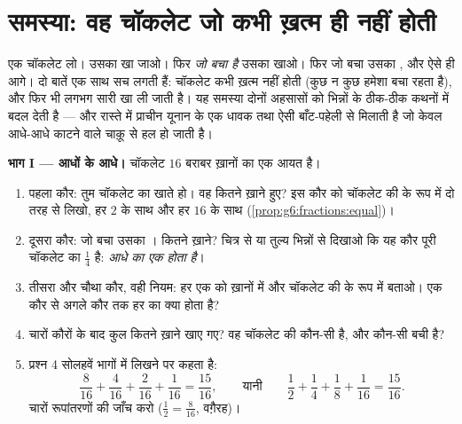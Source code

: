 \section{समस्या: वह चॉकलेट जो कभी ख़त्म ही नहीं होती}

\begin{problem}
\label{pb:g6:fractions:1}
एक चॉकलेट लो। उसका  खा जाओ। फिर \emph{जो बचा है} उसका 
खाओ। फिर जो बचा उसका , और ऐसे ही आगे। दो बातें एक साथ सच
लगती हैं: चॉकलेट कभी ख़त्म नहीं होती (कुछ न कुछ हमेशा बचा रहता
है), और फिर भी लगभग सारी खा ली जाती है। यह समस्या दोनों अहसासों
को भिन्नों के ठीक-ठीक कथनों में बदल देती है --- और रास्ते में
प्राचीन यूनान के एक धावक तथा ऐसी बाँट-पहेली से मिलाती है जो केवल
आधे-आधे काटने वाले चाक़ू से हल हो जाती है।

\medskip
\noindent\textbf{भाग I --- आधों के आधे।}
चॉकलेट $16$ बराबर ख़ानों का एक आयत है।
\begin{enumerate}
  \item पहला कौर: तुम चॉकलेट का  खाते हो। वह कितने ख़ाने
        हुए? इस कौर को चॉकलेट की  के रूप में दो तरह से
        लिखो, हर $2$ के साथ और हर $16$ के साथ
        (\cref{prop:g6:fractions:equal})।
  \item दूसरा कौर: जो बचा उसका । कितने ख़ाने? चित्र से या
        तुल्य भिन्नों से दिखाओ कि यह कौर पूरी चॉकलेट का
        $\frac14$ है: \emph{आधे का  एक  होता है}।
  \item तीसरा और चौथा कौर, वही नियम: हर एक को ख़ानों में और
        चॉकलेट की  के रूप में बताओ। एक कौर से अगले कौर तक
        हर का क्या होता है?
  \item चारों कौरों के बाद कुल कितने ख़ाने खाए गए? वह चॉकलेट की
        कौन-सी  है, और कौन-सी  बची है?
  \item प्रश्न 4 सोलहवें भागों में लिखने पर कहता है:
        \[
        \frac{8}{16} + \frac{4}{16} + \frac{2}{16} + \frac{1}{16}
        = \frac{15}{16},
        \qquad\text{यानी}\qquad
        \frac12 + \frac14 + \frac18 + \frac{1}{16}
        = \frac{15}{16} .
        \]
        चारों रूपांतरणों की जाँच करो
        ($\frac12 = \frac{8}{16}$, वग़ैरह)।
\end{enumerate}


\end{problem}
